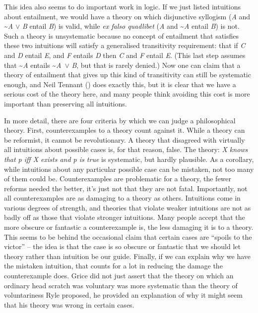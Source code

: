 \documentclass[
  11pt,
  letterpaper,
  DIV=11,
  numbers=noendperiod,
  oneside]{scrartcl}
\begin{document}
This idea also seems to do important work in logic. If we just listed
intuitions about entailment, we would have a theory on which disjunctive
syllogism (\emph{A} and \textasciitilde{}\emph{A} \({\vee}\) \emph{B}
entail \emph{B}) is valid, while \emph{ex falso quadlibet} (\emph{A} and
\textasciitilde{}\emph{A} entail \emph{B}) is not. Such a theory is
unsystematic because no concept of entailment that satisfies these two
intuitions will satisfy a generalised transitivity requirement: that if
\emph{C} and \emph{D} entail \emph{E}, and \emph{F} entails \emph{D}
then \emph{C} and \emph{F} entail \emph{E}. (This last step assumes that
\textasciitilde{}\emph{A} entails \textasciitilde{}\emph{A}~\({\vee}\)
\emph{B}, but that is rarely denied.) Now one can claim that a theory of
entailment that gives up this kind of transitivity can still be
systematic enough, and Neil Tennant ()
does exactly this, but it is clear that we have a serious cost of the
theory here, and many people think avoiding this cost is more important
than preserving all intuitions.

In more detail, there are four criteria by which we can judge a
philosophical theory. First, counterexamples to a theory count against
it. While a theory can be reformist, it cannot be revolutionary. A
theory that disagreed with virtually all intuitions about possible cases
is, for that reason, false. The theory: \emph{X knows that p iff X
exists and p is true} is systematic, but hardly plausible. As a
corollary, while intuitions about any particular possible case can be
mistaken, not too many of them could be. Counterexamples are problematic
for a theory, the fewer reforms needed the better, it's just not that
they are not fatal. Importantly, not all counterexamples are as damaging
to a theory as others. Intuitions come in various degrees of strength,
and theories that violate weaker intuitions are not as badly off as
those that violate stronger intuitions. Many people accept that the more
obscure or fantastic a counterexample is, the less damaging it is to a
theory. This seems to be behind the occasional claim that certain cases
are ``spoils to the victor'' -- the idea is that the case is so obscure
or fantastic that we should let theory rather than intuition be our
guide. Finally, if we can explain why we have the mistaken intuition,
that counts for a lot in reducing the damage the counterexample does.
Grice did not just assert that the theory on which an ordinary head
scratch was voluntary was more systematic than the theory of
voluntariness Ryle proposed, he provided an explanation of why it might
seem that his theory was wrong in certain cases.
\end{document}
